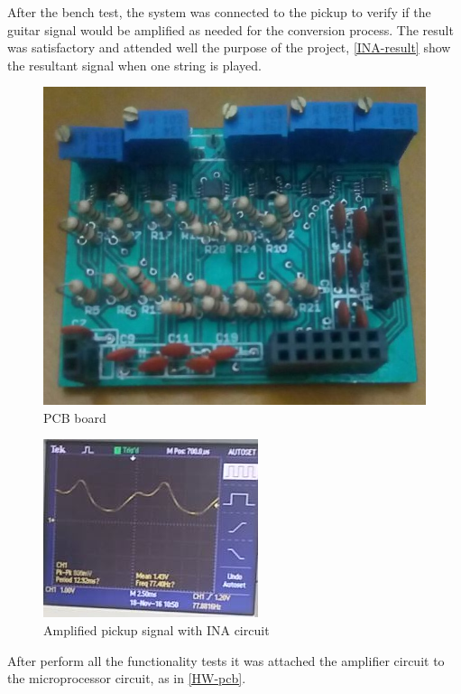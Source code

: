 After the bench test, the system was connected to the pickup to verify if the guitar signal would be
amplified as needed for the conversion process. The result was satisfactory and
attended well the purpose of the project, \autoref{INA-result} show
the resultant signal when one string is played.

\begin{figure}[!htpb]
  \centering
  \caption{PCB board}
  \label{assembled-pcb}
  \includegraphics[scale=0.28]{images/INA/assembled-pcb.jpeg}
\end{figure}

\begin{figure}[!htpb]
\centering
\caption{Amplified pickup signal with INA circuit}
\label{INA-result}
\includegraphics[scale=.9]{images/INA/result}
\end{figure}

After perform all the functionality tests it was attached the amplifier circuit to the
microprocessor circuit, as in \autoref{HW-pcb}.


